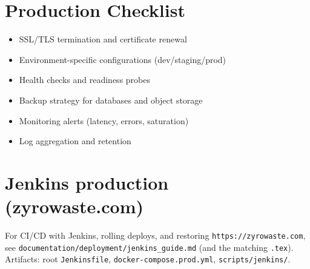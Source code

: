 \documentclass{article}
\begin{document}
\section{Production Checklist}

\begin{itemize}[leftmargin=*]
  \item SSL/TLS termination and certificate renewal
  \item Environment-specific configurations (dev/staging/prod)
  \item Health checks and readiness probes
  \item Backup strategy for databases and object storage
  \item Monitoring alerts (latency, errors, saturation)
  \item Log aggregation and retention
\end{itemize}

\section{Jenkins production (zyrowaste.com)}
For CI/CD with Jenkins, rolling deploys, and restoring \texttt{https://zyrowaste.com}, see \texttt{documentation/deployment/jenkins\_guide.md} (and the matching \texttt{.tex}). Artifacts: root \texttt{Jenkinsfile}, \texttt{docker-compose.prod.yml}, \texttt{scripts/jenkins/}.
\end{document}
